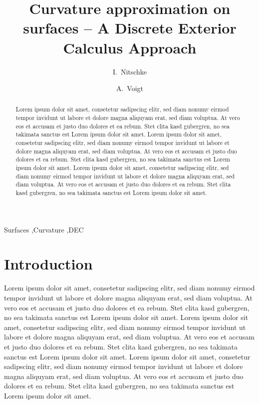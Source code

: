 


\begin{frontmatter}
  \title{Curvature approximation on surfaces -- A Discrete Exterior Calculus Approach}

  \author{I.~Nitschke}
  
  \author{A.~Voigt}


  \begin{abstract}
    Lorem ipsum dolor sit amet, consetetur sadipscing elitr, sed diam nonumy eirmod tempor invidunt ut labore et dolore magna aliquyam erat, sed diam voluptua. At vero eos et accusam et justo duo dolores et ea rebum. Stet clita kasd gubergren, no sea takimata sanctus est Lorem ipsum dolor sit amet. Lorem ipsum dolor sit amet, consetetur sadipscing elitr, sed diam nonumy eirmod tempor invidunt ut labore et dolore magna aliquyam erat, sed diam voluptua. At vero eos et accusam et justo duo dolores et ea rebum. Stet clita kasd gubergren, no sea takimata sanctus est Lorem ipsum dolor sit amet. Lorem ipsum dolor sit amet, consetetur sadipscing elitr, sed diam nonumy eirmod tempor invidunt ut labore et dolore magna aliquyam erat, sed diam voluptua. At vero eos et accusam et justo duo dolores et ea rebum. Stet clita kasd gubergren, no sea takimata sanctus est Lorem ipsum dolor sit amet.
  \end{abstract}

  \begin{keyword}
    Surfaces \sep Curvature \sep DEC
  \end{keyword}
\end{frontmatter}

\section{Introduction}
Lorem ipsum dolor sit amet, consetetur sadipscing elitr, sed diam nonumy eirmod tempor invidunt ut labore et dolore magna aliquyam erat, sed diam voluptua. At vero eos et accusam et justo duo dolores et ea rebum. Stet clita kasd gubergren, no sea takimata sanctus est Lorem ipsum dolor sit amet. Lorem ipsum dolor sit amet, consetetur sadipscing elitr, sed diam nonumy eirmod tempor invidunt ut labore et dolore magna aliquyam erat, sed diam voluptua. At vero eos et accusam et justo duo dolores et ea rebum. Stet clita kasd gubergren, no sea takimata sanctus est Lorem ipsum dolor sit amet. Lorem ipsum dolor sit amet, consetetur sadipscing elitr, sed diam nonumy eirmod tempor invidunt ut labore et dolore magna aliquyam erat, sed diam voluptua. At vero eos et accusam et justo duo dolores et ea rebum. Stet clita kasd gubergren, no sea takimata sanctus est Lorem ipsum dolor sit amet.


